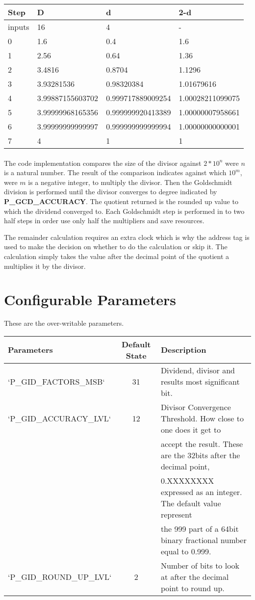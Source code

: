 \documentclass[letterpaper]{article}
\begin{document}
	\begin{tabular}{l|l|l|l}
		Step & D & d & 2-d \\ \hline
		inputs & 16 & 4 & - \\
		0 & 1.6 & 0.4 & 1.6 \\
		1 & 2.56 & 0.64 & 1.36 \\
		2 & 3.4816 & 0.8704 & 1.1296 \\
		3 & 3.93281536 & 0.98320384 & 1.01679616 \\
		4 & 3.99887155603702 & 0.999717889009254 & 1.00028211099075 \\
		5 & 3.99999968165356 & 0.999999920413389 & 1.00000007958661 \\
		6 & 3.99999999999997 & 0.999999999999994 & 1.00000000000001 \\
		7 & 4 & 1 & 1 \\
	\end{tabular}
	
	\paragraph{}The code implementation compares the size of the divisor against $ 2*10^n $ were $ n $ is a natural number. The result of the comparison indicates against which $ 10^m $, were $ m $ is a negative integer, to multiply the divisor. Then the Goldschmidt division is performed until the divisor converges to degree indicated by \textbf{P\_GCD\_ACCURACY}. The quotient returned is the rounded up value to which the dividend converged to. Each Goldschmidt step is performed in to two half steps in order use only half the multipliers and save resources.
	
	The remainder calculation requires an extra clock which is why the address tag is used to make the decision on whether to do the calculation or skip it. The calculation simply takes the value after the decimal point of the quotient a multiplies it by the divisor.
	
	\section{Configurable Parameters}
	
	These are the over-writable parameters.
	
	\begin{tabular}{l|c|l}
		Parameters & Default State & Description \\ \hline
		`P\_GID\_FACTORS\_MSB` &  31 & Dividend, divisor and results most significant bit. \\ \hline
		`P\_GID\_ACCURACY\_LVL` & 12 & Divisor Convergence Threshold. How close to one does it get to\\   & & accept the result. These are the 32bits after the decimal point,\\
		& & 0.XXXXXXXX expressed as an integer. The default value represent\\
		& & the 999 part of a 64bit binary fractional number equal to 0.999. \\ \hline
		`P\_GID\_ROUND\_UP\_LVL` &  2 & Number of bits to look at after the decimal point to round up. \\ 
	\end{tabular}
	
\end{document}

